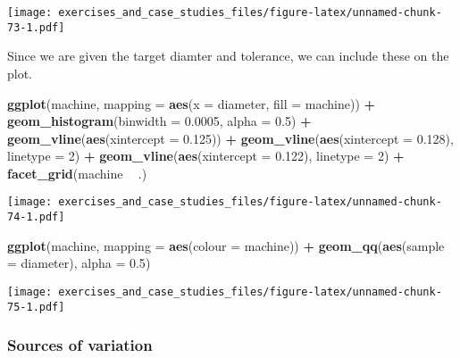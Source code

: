 \documentclass[]{book}
\newenvironment{Shaded}{\begin{snugshade}}{\end{snugshade}}
\newcommand{\DataTypeTok}[1]{\textcolor[rgb]{0.13,0.29,0.53}{#1}}
\newcommand{\DecValTok}[1]{\textcolor[rgb]{0.00,0.00,0.81}{#1}}
\newcommand{\FloatTok}[1]{\textcolor[rgb]{0.00,0.00,0.81}{#1}}
\newcommand{\KeywordTok}[1]{\textcolor[rgb]{0.13,0.29,0.53}{\textbf{#1}}}
\newcommand{\NormalTok}[1]{#1}
\newcommand{\OperatorTok}[1]{\textcolor[rgb]{0.81,0.36,0.00}{\textbf{#1}}}
\newcommand{\StringTok}[1]{\textcolor[rgb]{0.31,0.60,0.02}{#1}}
\theoremstyle{definition}
\theoremstyle{definition}
\theoremstyle{definition}
\theoremstyle{remark}
\begin{document}
\texttt{[image: exercises\_and\_case\_studies\_files/figure-latex/unnamed-chunk-73-1.pdf]}

Since we are given the target diamter and tolerance, we can include
these on the plot.

\begin{Shaded}
\begin{Highlighting}[]
\KeywordTok{ggplot}\NormalTok{(machine, }\DataTypeTok{mapping =} \KeywordTok{aes}\NormalTok{(}\DataTypeTok{x =}\NormalTok{ diameter, }\DataTypeTok{fill =}\NormalTok{ machine)) }\OperatorTok{+}
\StringTok{  }\KeywordTok{geom_histogram}\NormalTok{(}\DataTypeTok{binwidth =} \FloatTok{0.0005}\NormalTok{, }\DataTypeTok{alpha =} \FloatTok{0.5}\NormalTok{) }\OperatorTok{+}
\StringTok{  }\KeywordTok{geom_vline}\NormalTok{(}\KeywordTok{aes}\NormalTok{(}\DataTypeTok{xintercept =} \FloatTok{0.125}\NormalTok{)) }\OperatorTok{+}
\StringTok{  }\KeywordTok{geom_vline}\NormalTok{(}\KeywordTok{aes}\NormalTok{(}\DataTypeTok{xintercept =} \FloatTok{0.128}\NormalTok{), }\DataTypeTok{linetype =} \DecValTok{2}\NormalTok{) }\OperatorTok{+}
\StringTok{  }\KeywordTok{geom_vline}\NormalTok{(}\KeywordTok{aes}\NormalTok{(}\DataTypeTok{xintercept =} \FloatTok{0.122}\NormalTok{), }\DataTypeTok{linetype =} \DecValTok{2}\NormalTok{) }\OperatorTok{+}
\StringTok{  }\KeywordTok{facet_grid}\NormalTok{(machine }\OperatorTok{~}\StringTok{ }\NormalTok{.)}
\end{Highlighting}
\end{Shaded}

\texttt{[image: exercises\_and\_case\_studies\_files/figure-latex/unnamed-chunk-74-1.pdf]}

\begin{Shaded}
\begin{Highlighting}[]
\KeywordTok{ggplot}\NormalTok{(machine, }\DataTypeTok{mapping =} \KeywordTok{aes}\NormalTok{(}\DataTypeTok{colour =}\NormalTok{ machine)) }\OperatorTok{+}
\StringTok{  }\KeywordTok{geom_qq}\NormalTok{(}\KeywordTok{aes}\NormalTok{(}\DataTypeTok{sample =}\NormalTok{ diameter), }\DataTypeTok{alpha =} \FloatTok{0.5}\NormalTok{)}
\end{Highlighting}
\end{Shaded}

\texttt{[image: exercises\_and\_case\_studies\_files/figure-latex/unnamed-chunk-75-1.pdf]}

\hypertarget{sources-of-variation-1}{%
\subsubsection{Sources of variation}\label{sources-of-variation-1}}
\end{document}
